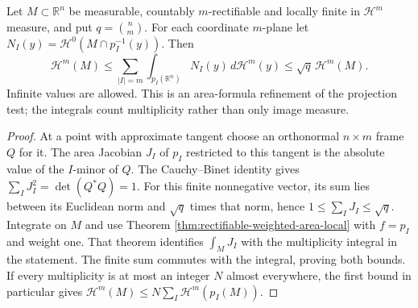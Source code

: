 \begin{proposition}\label{prop:coordinate-projection-area-bounds}
Let $M\subset\mathbb R^n$ be measurable, countably $m$-rectifiable and locally finite in $\mathcal H^m$ measure, and put $q=\binom nm$. For each coordinate $m$-plane let $N_I(y)=\mathcal H^0(M\cap p_I^{-1}(y))$. Then
\[
 \mathcal H^m(M)\leq\sum_{|I|=m}\int_{p_I(\mathbb R^n)}N_I(y)\,d\mathcal H^m(y)
 \leq\sqrt q\,\mathcal H^m(M).
\]
Infinite values are allowed. This is an area-formula refinement of the projection test; the integrals count multiplicity rather than only image measure.
\end{proposition}
\begin{proof}
At a point with approximate tangent choose an orthonormal $n\times m$ frame $Q$ for it. The area Jacobian $J_I$ of $p_I$ restricted to this tangent is the absolute value of the $I$-minor of $Q$. The Cauchy--Binet identity gives $\sum_IJ_I^2=\det(Q^*Q)=1$. For this finite nonnegative vector, its sum lies between its Euclidean norm and $\sqrt q$ times that norm, hence $1\leq\sum_IJ_I\leq\sqrt q$. Integrate on $M$ and use Theorem \ref{thm:rectifiable-weighted-area-local} with $f=p_I$ and weight one. That theorem identifies $\int_MJ_I$ with the multiplicity integral in the statement. The finite sum commutes with the integral, proving both bounds. If every multiplicity is at most an integer $N$ almost everywhere, the first bound in particular gives $\mathcal H^m(M)\leq N\sum_I\mathcal H^m(p_I(M))$.
\end{proof}
